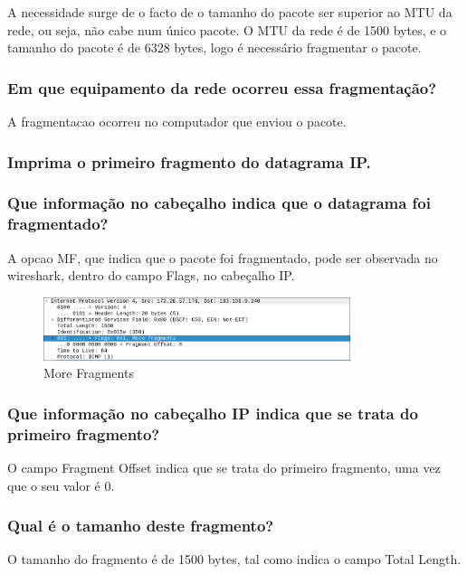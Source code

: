 \documentclass{article}
\begin{document}
A necessidade surge de o facto de o tamanho do pacote ser superior ao MTU da rede, ou seja, não cabe num único pacote. O MTU da rede é de 1500 bytes, e o tamanho do pacote é de 6328 bytes, logo é necessário fragmentar o pacote.

\subsubsection{Em que equipamento da rede ocorreu essa fragmentação?}

A fragmentacao ocorreu no computador que enviou o pacote. 

\subsubsection{Imprima o primeiro fragmento do datagrama IP.}
\subsubsection{Que informação no cabeçalho indica que o datagrama foi fragmentado?}

A opcao MF, que indica que o pacote foi fragmentado, pode ser observada no wireshark, dentro do campo Flags, no cabeçalho IP.

\begin{figure}[h]
    \centering
    \includegraphics[width=0.8\textwidth]{images/mf.png}
    \caption{\label{fig:more_fragments}More Fragments}
\end{figure}

\subsubsection{Que informação
no cabeçalho IP indica que se trata do primeiro fragmento?}

O campo Fragment Offset indica que se trata do primeiro fragmento, uma vez que o seu valor é 0.

\subsubsection{Qual é o tamanho deste fragmento?}

O tamanho do fragmento é de 1500 bytes, tal como indica o campo Total Length.
\end{document}
